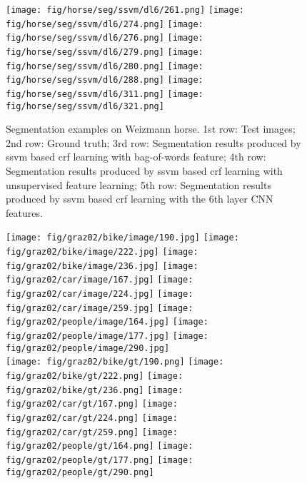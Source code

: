 \documentclass[10pt,3p]{elsarticle}
\newcommand{\ssvm}{{\sc ssvm}\xspace}
\newcommand{\crf}{{\sc crf}\xspace}
\begin{document}
\begin{figure}[t]
     \texttt{[image: fig/horse/seg/ssvm/dl6/261.png]}
     \texttt{[image: fig/horse/seg/ssvm/dl6/274.png]}
     \texttt{[image: fig/horse/seg/ssvm/dl6/276.png]}       
	\texttt{[image: fig/horse/seg/ssvm/dl6/279.png]}                  
    \texttt{[image: fig/horse/seg/ssvm/dl6/280.png]}
     \texttt{[image: fig/horse/seg/ssvm/dl6/288.png]}  
     \texttt{[image: fig/horse/seg/ssvm/dl6/311.png]}   
     \texttt{[image: fig/horse/seg/ssvm/dl6/321.png]} \\

\caption{Segmentation examples on Weizmann horse. 1st row: Test images; 2nd row: Ground truth; 
%
3rd row: Segmentation results produced by \ssvm based \crf learning with bag-of-words feature;
4th row: Segmentation results produced by \ssvm based \crf learning with unsupervised feature learning;
5th row: Segmentation results produced by \ssvm based \crf learning with the 6th layer CNN features. }
\label{fig:seg_horse}     
\end{figure}\begin{figure}[t]
\centering
%
    \texttt{[image: fig/graz02/bike/image/190.jpg]}
     \texttt{[image: fig/graz02/bike/image/222.jpg]}
     \texttt{[image: fig/graz02/bike/image/236.jpg]}       
	\texttt{[image: fig/graz02/car/image/167.jpg]}                  
    \texttt{[image: fig/graz02/car/image/224.jpg]}
     \texttt{[image: fig/graz02/car/image/259.jpg]}  
     \texttt{[image: fig/graz02/people/image/164.jpg]}   
     \texttt{[image: fig/graz02/people/image/177.jpg]} 
     \texttt{[image: fig/graz02/people/image/290.jpg]} \\
     
     \texttt{[image: fig/graz02/bike/gt/190.png]}
     \texttt{[image: fig/graz02/bike/gt/222.png]}
     \texttt{[image: fig/graz02/bike/gt/236.png]}       
	\texttt{[image: fig/graz02/car/gt/167.png]}                  
    \texttt{[image: fig/graz02/car/gt/224.png]}
     \texttt{[image: fig/graz02/car/gt/259.png]}  
     \texttt{[image: fig/graz02/people/gt/164.png]}   
     \texttt{[image: fig/graz02/people/gt/177.png]} 
     \texttt{[image: fig/graz02/people/gt/290.png]} \\
     

\end{figure}
\end{document}
